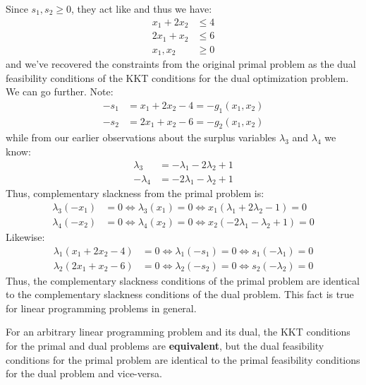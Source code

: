 Since $s_1, s_2 \geq 0$, they act like  and thus we have:
\begin{displaymath}
\begin{aligned}
x_1 + 2x_2 &\leq  4\\
2x_1 + x_2 &\leq 6\\
x_1,x_2&\geq 0
\end{aligned}
\end{displaymath}
and we've recovered the constraints from the original primal problem as the dual feasibility conditions of the KKT conditions for the dual optimization problem. We can go further. Note:
\begin{align*}
-s_1 &= x_1 + 2x_2 - 4= -g_1(x_1,x_2)\\
-s_2 &= 2x_1 + x_2 -6 = -g_2(x_1,x_2)
\end{align*}
while from our earlier observations about the surplus variables $\lambda_3$ and $\lambda_4$ we know:
\begin{align*}
\lambda_3 &= -\lambda_1 - 2\lambda_2 + 1\\
-\lambda_4 &= -2\lambda_1 - \lambda_2 + 1
\end{align*}
Thus, complementary slackness from the primal problem is:
\begin{align*}
\lambda_3(-x_1) &= 0 \iff \lambda_3(x_1) =0  \iff 
	x_1(\lambda_1 + 2\lambda_2 - 1) = 0\\
\lambda_4(-x_2) &= 0 \iff \lambda_4(x_2) =0 \iff x_2(-2\lambda_1 - \lambda_2 + 1) = 0
\end{align*}
Likewise:
\begin{align*}
\lambda_1(x_1 + 2x_2 - 4) &=0 \iff \lambda_1(-s_1) = 0 \iff s_1(-\lambda_1) = 0\\
\lambda_2(2x_1 + x_2 - 6) &=0 \iff \lambda_2(-s_2) = 0 \iff s_2(-\lambda_2) = 0
\end{align*}
Thus, the complementary slackness conditions of the primal problem are identical to the complementary slackness conditions of the dual problem. This fact is true for linear programming problems in general.

\begin{remark} For an arbitrary linear programming problem and its dual, the KKT conditions for the primal and dual problems are \textbf{equivalent}, but the dual feasibility conditions for the primal problem are identical to the primal feasibility conditions for the dual problem and vice-versa. 
\end{remark}

